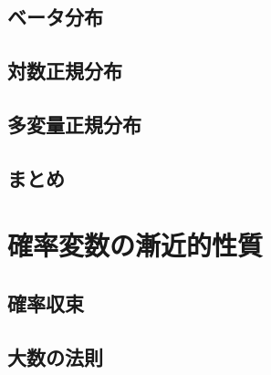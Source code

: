\subsection{ベータ分布}

\subsection{対数正規分布}

\subsection{多変量正規分布}

\subsection{まとめ}

\section{確率変数の漸近的性質}
\label{sec:stat-asymptotics}


\subsection{確率収束}

\subsection{大数の法則}

